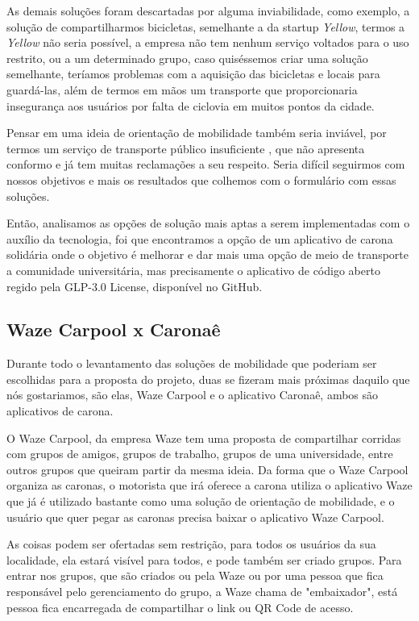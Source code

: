 As demais soluções foram descartadas por alguma inviabilidade, como exemplo, a solução de compartilharmos bicicletas, semelhante a da startup \textit{Yellow}, termos a \textit{Yellow} não seria possível, a empresa não tem nenhum serviço voltados para o uso restrito, ou a um determinado grupo, caso quiséssemos criar uma solução semelhante, teríamos problemas com a aquisição das bicicletas e locais para guardá-las, além de termos em mãos um transporte que proporcionaria insegurança aos usuários por falta de ciclovia em muitos pontos da cidade.

Pensar em uma ideia de orientação de mobilidade também seria inviável, por termos um serviço de transporte público insuficiente \cite{sau2018}, que não apresenta conformo e já tem muitas reclamações a seu respeito. Seria difícil seguirmos com nossos objetivos e mais os resultados que colhemos com o formulário com essas soluções.

Então, analisamos as opções de solução mais aptas a serem implementadas com o auxílio da tecnologia, foi que encontramos a opção de um aplicativo de carona solidária onde o objetivo é melhorar e dar mais uma opção de meio de transporte a comunidade universitária, mas precisamente o aplicativo de código aberto regido pela GLP-3.0 License, disponível no GitHub.

\subsection{Waze Carpool x Caronaê}
    Durante todo o levantamento das soluções de mobilidade que poderiam ser escolhidas para a proposta do projeto, duas se fizeram mais próximas daquilo que nós gostariamos, são elas, Waze Carpool e o aplicativo Caronaê, ambos são aplicativos de carona.
    
    O Waze Carpool, da empresa Waze tem uma proposta de compartilhar corridas com grupos de amigos, grupos de trabalho, grupos de uma universidade, entre outros grupos que queiram partir da mesma ideia. Da forma que o Waze Carpool organiza as caronas, o motorista que irá oferece a carona utiliza o aplicativo Waze que já é utilizado bastante como uma solução de orientação de mobilidade, e o usuário que quer pegar as caronas precisa baixar o aplicativo Waze Carpool.
    
    As coisas podem ser ofertadas sem restrição, para todos os usuários da sua localidade, ela estará visível para todos, e pode também ser criado grupos. Para entrar nos grupos, que são criados ou pela Waze ou por uma pessoa que fica responsável pelo gerenciamento do grupo, a Waze chama de "embaixador", está pessoa fica encarregada de compartilhar o link ou QR Code de acesso. 
    
